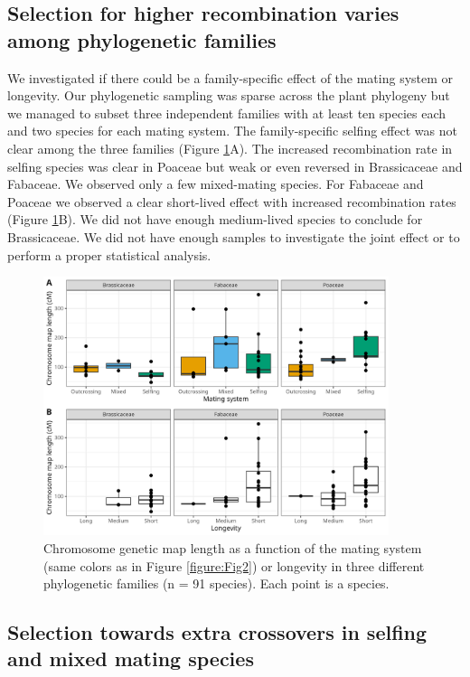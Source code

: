\documentclass{article}
\begin{document}
\subsection*{Selection for higher recombination varies among phylogenetic families}


We investigated if there could be a family-specific effect of the mating system or longevity. Our phylogenetic sampling was sparse across the plant phylogeny but we managed to subset three independent families with at least ten species each and two species for each mating system. The family-specific selfing effect was not clear among the three families (Figure \ref{figure:Fig3}A). The increased recombination rate in selfing species was clear in Poaceae but weak or even reversed in Brassicaceae and Fabaceae. We observed only a few mixed-mating species. For Fabaceae and Poaceae we observed a clear short-lived effect with increased recombination rates (Figure \ref{figure:Fig3}B). We did not have enough medium-lived species to conclude for Brassicaceae. We did not have enough samples to investigate the joint effect or to perform a proper statistical analysis.



\begin{figure}[h!]
  \includegraphics[width=0.9\textwidth]{figures/Fig3.jpeg}
  \centering
  \caption{Chromosome genetic map length as a function of the mating system (same colors as in Figure \ref{figure:Fig2}) or longevity in three different phylogenetic families (n = 91 species). Each point is a species.
  }
  \label{figure:Fig3}
\end{figure}



\subsection*{Selection towards extra crossovers in selfing and mixed mating species}
\end{document}
